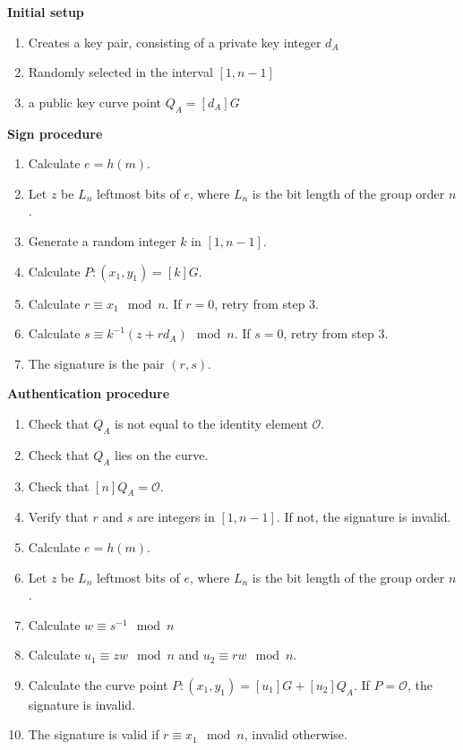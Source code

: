 \documentclass[12pt]{article}
\theoremstyle{definition}
\begin{document}
	\textbf{Initial setup}
	\begin{enumerate}
		\item Creates a key pair, consisting of a private key integer $d_{A}$
		\item Randomly selected in the interval $[1,n-1]$
		\item a public key curve point $Q_A=[d_A]G$
	\end{enumerate}
	
	\textbf{Sign procedure}
	\begin{enumerate}
		\item Calculate $e=h(m)$.
		\item Let $z$ be $L_n$ leftmost bits of $e$, where $L_n$ is the  bit length of the group order $n$.
		\item Generate a random integer $k$ in $[1,n-1]$.
		\item Calculate $P:(x_1,y_1)=[k]G$.
		\item Calculate $r\equiv x_1\mod n$. If $r=0$, retry from step 3.
		\item Calculate $s\equiv k^{-1}(z+rd_A)\mod n$. If $s=0$, retry from step 3.
		\item The signature is the pair $(r,s)$.
	\end{enumerate}
	
	\textbf{Authentication procedure}
	\begin{enumerate}
		\item Check that $Q_{A}$ is not equal to the identity element $\mathcal{O}$.
		\item Check that $Q_{A}$ lies on the curve.
		\item Check that $[n]Q_{A}=\mathcal{O}$.
		\item Verify that $r$ and $s$ are integers in $[1,n-1]$. If not, the signature is invalid.
		\item Calculate $e=h(m)$.
		\item Let $z$ be $L_n$ leftmost bits of $e$, where $L_n$ is the  bit length of the group order $n$.
		\item Calculate $w\equiv s^{-1}\mod n$
		\item Calculate $u_1\equiv zw\mod n$ and $u_2\equiv rw\mod n$.
		\item Calculate the curve point $P:(x_1,y_1)=[u_1]G+[u_2]Q_A$. If $P=\mathcal{O}$, the signature is invalid.
		\item The signature is valid if $r\equiv x_1\mod n$, invalid otherwise.
	\end{enumerate}
	
\end{document}
